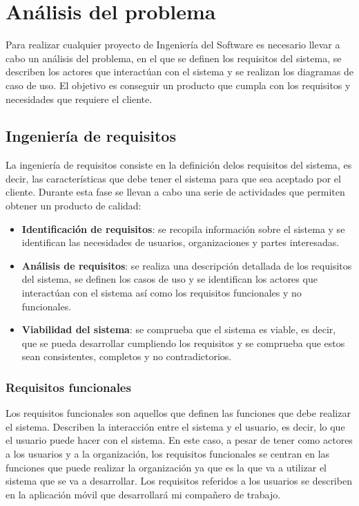 \chapter{Análisis del problema}\label{ch:analisis-del-problema}

Para realizar cualquier proyecto de Ingeniería del Software es necesario llevar a cabo un análisis del problema,
en el que se definen los requisitos del sistema, se describen los actores que interactúan con el sistema y se
realizan los diagramas de caso de uso. El objetivo es conseguir un producto que cumpla con los requisitos y
necesidades que requiere el cliente.

\section{Ingeniería de requisitos}\label{sec:ingenieria-de-requisitos}

La ingeniería de requisitos consiste en la definición delos requisitos del sistema, es decir, las características
que debe tener el sistema para que sea aceptado por el cliente. Durante esta fase se llevan a cabo una serie
de actividades que permiten obtener un producto de calidad:

\begin{itemize}
    \item \textbf{Identificación de requisitos}: se recopila información sobre el sistema y se identifican
    las necesidades de usuarios, organizaciones y partes interesadas.
    \item \textbf{Análisis de requisitos}: se realiza una descripción detallada de los requisitos del sistema,
    se definen los casos de uso y se identifican los actores que interactúan con el sistema así como los
    requisitos funcionales y no funcionales.
    \item \textbf{Viabilidad del sistema}: se comprueba que el sistema es viable, es decir, que se pueda
    desarrollar cumpliendo los requisitos y se comprueba que estos sean consistentes, completos y no contradictorios.
\end{itemize}

\newpage

\subsection{Requisitos funcionales}\label{subsec:requisitos-funcionales}

Los requisitos funcionales son aquellos que definen las funciones que debe realizar el sistema. Describen la
interacción entre el sistema y el usuario, es decir, lo que el usuario puede hacer con el sistema. En este caso,
a pesar de tener como actores a los usuarios y a la organización, los requisitos funcionales se centran en
las funciones que puede realizar la organización ya que es la que va a utilizar el sistema que se va a desarrollar.
Los requisitos referidos a los usuarios se describen en la aplicación móvil que desarrollará mi compañero de
trabajo.

